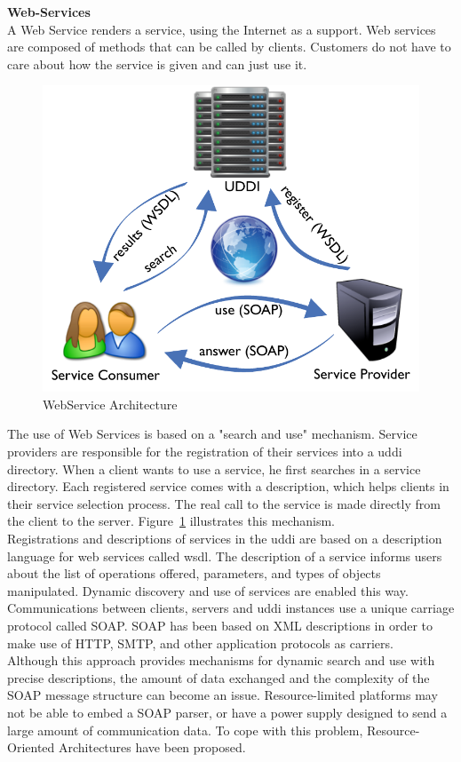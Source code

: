 {\bf Web-Services}\\
A Web Service renders a service, using the Internet as a support. Web services are composed of methods that can be called by clients. Customers do not have to care about how the service is given and can just use it.\\
\begin{figure}
  \centering
  \includegraphics[width=.5\textwidth]{part1/pics/WSArchi.pdf}
  \caption{WebService Architecture}
  \label{fig:web-servce-archi}
\end{figure}

The use of Web Services is based on a "search and use" mechanism. Service providers are responsible for the registration of their services into a \gls{uddi} directory. When a client wants to use a service, he first searches in a service directory. Each registered service comes with a description, which helps clients in their service selection process. The real call to the service is made directly from the client to the server. Figure~\ref{fig:web-servce-archi} illustrates this mechanism.\\

Registrations and descriptions of services in the \gls{uddi} are based on a description language for web services called \gls{wsdl}. The description of a service informs users about the list of operations offered, parameters, and types of objects manipulated. Dynamic discovery and use of services are enabled this way.\\
Communications between clients, servers and \gls{uddi} instances use a unique carriage protocol called SOAP. SOAP has been based on XML descriptions in order to make use of HTTP, SMTP, and other application protocols as carriers.\\

Although this approach provides mechanisms for dynamic search and use with precise descriptions, the amount of data exchanged and the complexity of the SOAP message structure can become an issue. Resource-limited platforms may not be able to embed a SOAP parser, or have a power supply designed to send a large amount of communication data. To cope with this problem, Resource-Oriented Architectures have been proposed.\\


